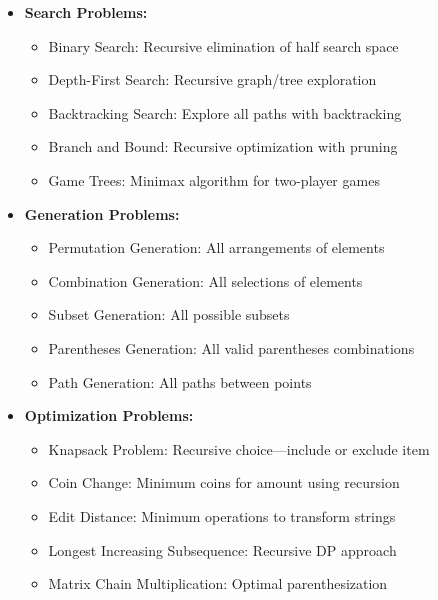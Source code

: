 \documentclass[a4paper,10pt]{book}
\begin{document}
\begin{itemize}[leftmargin=*]
    \item \textbf{Search Problems:}
    \begin{itemize}
        \item Binary Search: Recursive elimination of half search space
        \item Depth-First Search: Recursive graph/tree exploration
        \item Backtracking Search: Explore all paths with backtracking
        \item Branch and Bound: Recursive optimization with pruning
        \item Game Trees: Minimax algorithm for two-player games
    \end{itemize}

    \item \textbf{Generation Problems:}
    \begin{itemize}
        \item Permutation Generation: All arrangements of elements
        \item Combination Generation: All selections of elements
        \item Subset Generation: All possible subsets
        \item Parentheses Generation: All valid parentheses combinations
        \item Path Generation: All paths between points
    \end{itemize}

    \item \textbf{Optimization Problems:}
    \begin{itemize}
        \item Knapsack Problem: Recursive choice—include or exclude item
        \item Coin Change: Minimum coins for amount using recursion
        \item Edit Distance: Minimum operations to transform strings
        \item Longest Increasing Subsequence: Recursive DP approach
        \item Matrix Chain Multiplication: Optimal parenthesization
    \end{itemize}
\end{itemize}
\end{document}
